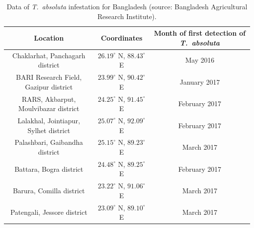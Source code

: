 \documentclass[10pt]{article}
\theoremstyle{definition}
\newcommand{\tuta}{\emph{T.~absoluta}}
\begin{document}
\begin{table}[!h]
\caption{Data of \tuta{} infestation for Bangladesh (source: Bangladesh
Agricultural Research Institute). \label{tab:bgdData}}
\centering
{} %
\begin{tabular}{*{3}{c}}
\toprule
Location & Coordinates & Month of first detection of \tuta{} \\
\midrule
Chaklarhat, Panchagarh district & $26.19^\circ$ N, $88.43^\circ$ E & May 2016 \\
BARI Research Field, Gazipur district & $23.99^\circ$ N, $90.42^\circ$ E & January 2017 \\
RARS, Akbarput, Moulvibazar district & $24.25^\circ$ N, $91.45^\circ$ E & February 2017 \\
Lalakhal, Jointiapur, Sylhet district & $25.07^\circ$ N, $92.09^\circ$ E & February 2017 \\
Palashbari, Gaibandha district & $25.15 ^\circ$ N, $89.23 ^\circ$ E & March 2017 \\
Battara, Bogra district & $24.48^\circ$ N, $89.25^\circ$ E & February 2017 \\
Barura, Comilla district & $23.22^\circ$ N, $91.06^\circ$ E & March 2017 \\
Patengali, Jessore district & $23.09 ^\circ$ N, $89.10 ^\circ$ E & March 2017 \\
\bottomrule
\end{tabular}
\end{table}

%
\end{document}
